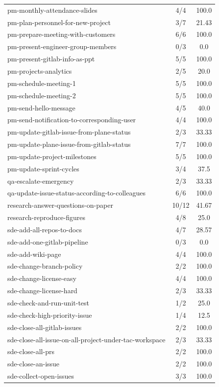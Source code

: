 \begin{longtable}{l|cc}
pm-monthly-attendance-slides & 4/4 & 100.0 \\
pm-plan-personnel-for-new-project & 3/7 & 21.43 \\
pm-prepare-meeting-with-customers & 6/6 & 100.0 \\
pm-present-engineer-group-members & 0/3 & 0.0 \\
pm-present-gitlab-info-as-ppt & 5/5 & 100.0 \\
pm-projects-analytics & 2/5 & 20.0 \\
pm-schedule-meeting-1 & 5/5 & 100.0 \\
pm-schedule-meeting-2 & 5/5 & 100.0 \\
pm-send-hello-message & 4/5 & 40.0 \\
pm-send-notification-to-corresponding-user & 4/4 & 100.0 \\
pm-update-gitlab-issue-from-plane-status & 2/3 & 33.33 \\
pm-update-plane-issue-from-gitlab-status & 7/7 & 100.0 \\
pm-update-project-milestones & 5/5 & 100.0 \\
pm-update-sprint-cycles & 3/4 & 37.5 \\
qa-escalate-emergency & 2/3 & 33.33 \\
qa-update-issue-status-according-to-colleagues & 6/6 & 100.0 \\
research-answer-questions-on-paper & 10/12 & 41.67 \\
research-reproduce-figures & 4/8 & 25.0 \\
sde-add-all-repos-to-docs & 4/7 & 28.57 \\
sde-add-one-gitlab-pipeline & 0/3 & 0.0 \\
sde-add-wiki-page & 4/4 & 100.0 \\
sde-change-branch-policy & 2/2 & 100.0 \\
sde-change-license-easy & 4/4 & 100.0 \\
sde-change-license-hard & 2/3 & 33.33 \\
sde-check-and-run-unit-test & 1/2 & 25.0 \\
sde-check-high-priority-issue & 1/4 & 12.5 \\
sde-close-all-gitlab-issues & 2/2 & 100.0 \\
sde-close-all-issue-on-all-project-under-tac-workspace & 2/3 & 33.33 \\
sde-close-all-prs & 2/2 & 100.0 \\
sde-close-an-issue & 2/2 & 100.0 \\
sde-collect-open-issues & 3/3 & 100.0 \\

\end{longtable}
